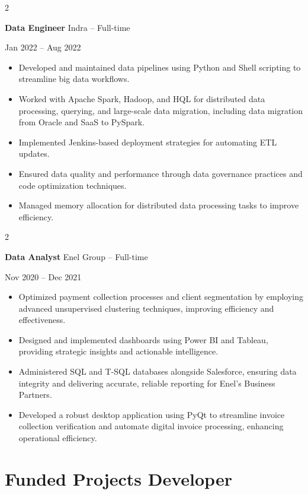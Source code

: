\documentclass[10pt, letterpaper]{article}
\newenvironment{highlights}{
    \begin{itemize}[
        topsep=0.10 cm,
        parsep=0.10 cm,
        partopsep=0pt,
        itemsep=0pt,
        leftmargin=0 cm + 10pt
    ]
}{
    \end{itemize}
} %
\newenvironment{twocolentry}[2][]{
    \onecolentry
    \def\secondColumn{#2}
    \setcolumnwidth{\fill, 4.5 cm}
    \begin{paracol}{2}
}{
    \switchcolumn \raggedleft \secondColumn
    \end{paracol}
    \endonecolentry
} %
\begin{document}
\begin{twocolentry}{Jan 2022 – Aug 2022}
    \textbf{Data Engineer} \textbar Indra – Full-time
\end{twocolentry}
\begin{highlights}
    \item Developed and maintained data pipelines using Python and Shell scripting to streamline big data workflows.
    \item Worked with Apache Spark, Hadoop, and HQL for distributed data processing, querying, and large-scale data migration, including data migration from Oracle and SaaS to PySpark.
    \item Implemented Jenkins-based deployment strategies for automating ETL updates.
    \item Ensured data quality and performance through data governance practices and code optimization techniques.
    \item Managed memory allocation for distributed data processing tasks to improve efficiency.
\end{highlights}


\begin{twocolentry}{Nov 2020 – Dec 2021}
    \textbf{Data Analyst} \textbar Enel Group – Full-time
\end{twocolentry}
\begin{highlights}
    \item Optimized payment collection processes and client segmentation by employing advanced unsupervised clustering techniques, improving efficiency and effectiveness.
    \item Designed and implemented dashboards using Power BI and Tableau, providing strategic insights and actionable intelligence.
    \item Administered SQL and T-SQL databases alongside Salesforce, ensuring data integrity and delivering accurate, reliable reporting for Enel's Business Partners.
    \item Developed a robust desktop application using PyQt to streamline invoice collection verification and automate digital invoice processing, enhancing operational efficiency.
\end{highlights}


\vspace{0.3cm}



        \section*{Funded Projects Developer}
\end{document}
